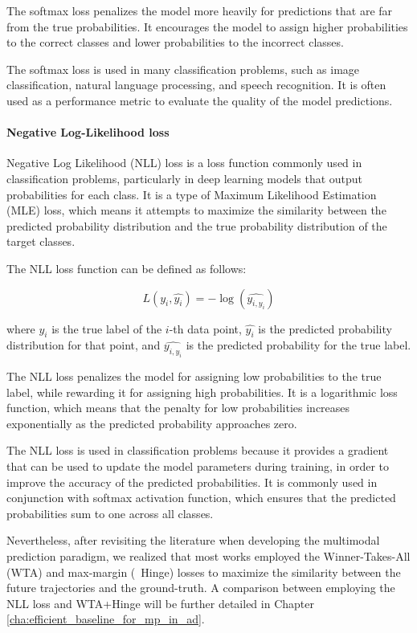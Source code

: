 The softmax loss penalizes the model more heavily for predictions that are far from the true probabilities. It encourages the model to assign higher probabilities to the correct classes and lower probabilities to the incorrect classes.

The softmax loss is used in many classification problems, such as image classification, natural language processing, and speech recognition. It is often used as a performance metric to evaluate the quality of the model predictions.

\paragraph{Negative Log-Likelihood loss}
\label{par:3_NLL_loss}

Negative Log Likelihood (NLL) loss is a loss function commonly used in classification problems, particularly in deep learning models that output probabilities for each class. It is a type of Maximum Likelihood Estimation (MLE) loss, which means it attempts to maximize the similarity between the predicted probability distribution and the true probability distribution of the target classes.

The NLL loss function can be defined as follows:

\begin{equation}
	L(y_i, \hat{y_i}) = -\log(\hat{y_{i,y_i}})
\end{equation}

where $y_i$ is the true label of the $i$-th data point, $\hat{y_i}$ is the predicted probability distribution for that point, and $\hat{y_{i,y_i}}$ is the predicted probability for the true label.

The NLL loss penalizes the model for assigning low probabilities to the true label, while rewarding it for assigning high probabilities. It is a logarithmic loss function, which means that the penalty for low probabilities increases exponentially as the predicted probability approaches zero.

The NLL loss is used in classification problems because it provides a gradient that can be used to update the model parameters during training, in order to improve the accuracy of the predicted probabilities. It is commonly used in conjunction with softmax activation function, which ensures that the predicted probabilities sum to one across all classes.

Nevertheless, after revisiting the literature when developing the multimodal prediction paradigm, we realized that most works employed the Winner-Takes-All (WTA) and max-margin (\aka \ Hinge) losses to maximize the similarity between the future trajectories and the ground-truth. A comparison between employing the NLL loss and WTA+Hinge will be further detailed in Chapter \ref{cha:efficient_baseline_for_mp_in_ad}.

